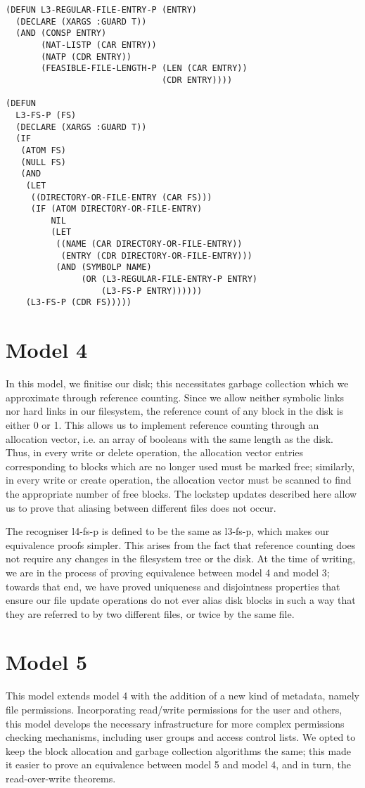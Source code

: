 \documentclass[format=sigconf,review=true]{acmart}
\begin{document}
\begin{lstlisting}
(DEFUN L3-REGULAR-FILE-ENTRY-P (ENTRY)
  (DECLARE (XARGS :GUARD T))
  (AND (CONSP ENTRY)
       (NAT-LISTP (CAR ENTRY))
       (NATP (CDR ENTRY))
       (FEASIBLE-FILE-LENGTH-P (LEN (CAR ENTRY))
                               (CDR ENTRY))))

(DEFUN
  L3-FS-P (FS)
  (DECLARE (XARGS :GUARD T))
  (IF
   (ATOM FS)
   (NULL FS)
   (AND
    (LET
     ((DIRECTORY-OR-FILE-ENTRY (CAR FS)))
     (IF (ATOM DIRECTORY-OR-FILE-ENTRY)
         NIL
         (LET
          ((NAME (CAR DIRECTORY-OR-FILE-ENTRY))
           (ENTRY (CDR DIRECTORY-OR-FILE-ENTRY)))
          (AND (SYMBOLP NAME)
               (OR (L3-REGULAR-FILE-ENTRY-P ENTRY)
                   (L3-FS-P ENTRY))))))
    (L3-FS-P (CDR FS)))))
\end{lstlisting}

\section{Model 4}
In this model, we finitise our disk; this necessitates garbage
collection which we approximate through reference
counting. Since we allow neither symbolic links nor hard links in our
filesystem, the reference count of any block in the disk is either 0
or 1. This allows us to implement reference counting through an
allocation vector, i.e. an array of booleans with the same length as
the disk. Thus, in every write or delete operation, the allocation
vector entries corresponding to blocks which are no longer used must
be marked free; similarly, in every write or create operation, the
allocation vector must be scanned to find the appropriate number of
free blocks. The lockstep updates described here allow us to prove
that aliasing between different files does not occur.

The recogniser l4-fs-p is defined to be the same as l3-fs-p, which
makes our equivalence proofs simpler. This arises from the fact that
reference counting does not require any changes in the filesystem tree
or the disk. At the time of writing, we are in the process of proving
equivalence between model 4 and model 3; towards that end, we have
proved uniqueness and disjointness properties that ensure our file
update operations do not ever alias disk blocks in such a way that
they are referred to by two different files, or twice by the same file.

\section{Model 5}
This model extends model 4 with the addition of a new kind of
metadata, namely file permissions. Incorporating read/write permissions
for the user and others, this model develops the necessary
infrastructure for more complex permissions checking mechanisms,
including user groups and access control lists. We opted to keep the
block allocation and garbage collection algorithms the same; this made
it easier to prove an equivalence between model 5 and model 4, and in
turn, the read-over-write theorems.
\end{document}
